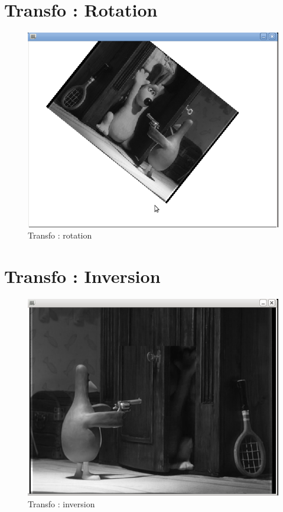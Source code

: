 \documentclass{beamer}
\begin{document}
\section{Transfo : Rotation}
\begin{frame}
\begin{figure}[!h]
\centering
\includegraphics[scale = 0.3]{Rotation.png}
\caption{Transfo : rotation}
\end{figure}
\end{frame}

\section{Transfo : Inversion}
\begin{frame}
\begin{figure}[!h]
\centering
\includegraphics[scale = 0.3]{Inversion.png}
\caption{Transfo : inversion}
\end{figure}
\end{frame}
\end{document}
